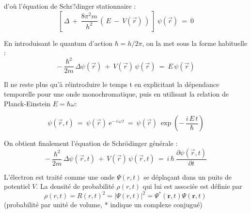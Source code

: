 \documentclass[openany]{book}
\begin{document}
d'où l'\'equation de Schr?dinger stationnaire :
$$
\left[ \, \Delta \ + \ \frac{8\pi^2m}{h^2} \, \left( \, E \ - \ V(\vec{r}) \, \right) \ \right] \ \psi(\vec{r}) \ = \ 0
$$

En introduisant le quantum d'action $\hbar = h/2\pi$, on la met sous la forme habituelle :
$$
- \ \frac{\hbar^2}{2m} \, \Delta \psi(\vec{r}) \ + \ V(\vec{r}) \, \psi(\vec{r}) \ = \ E \, \psi(\vec{r})
$$

Il ne reste plus qu'\`a r\'eintroduire le temps t en explicitant la d\'ependance temporelle pour une onde monochromatique, puis en utilisant la relation de Planck-Einstein $E = \hbar \omega$:

$$
\psi(\vec{r},t) \ = \ \psi(\vec{r}) \ \mathrm{e}^{- \, i \, \omega \, t} \ = \ \psi(\vec{r}) \ \exp \left( - \, \frac{i \, E \, t}{\hbar} \right)
$$

On obtient finalement l'\'equation de Schr\"odinger g\'en\'erale :
$$
- \ \frac{\hbar^2}{2m} \, \Delta \psi(\vec{r},t) \ + \ V(\vec{r}) \, \psi(\vec{r},t) \ = \ i \, \hbar \ \frac{\partial \psi(\vec{r},t)}{\partial t}
$$


L'\'electron est trait\'e comme une onde $\Psi(r,t)$ se d\'epla\c cant dans un puits de potentiel $V$.
La densit\'e de probabilit\'e $\rho(r,t)$ qui lui est associ\'ee est d\'efinie par
$$
\rho(r,t)= R(r,t)^2 = |\Psi(r,t)|^2=\Psi^*(\mathbf{r},t)\Psi(\mathbf{r},t)\,\!
$$
(probabilit\'e par unit\'e de volume, * indique un complexe conjugu\'e)
\end{document}
